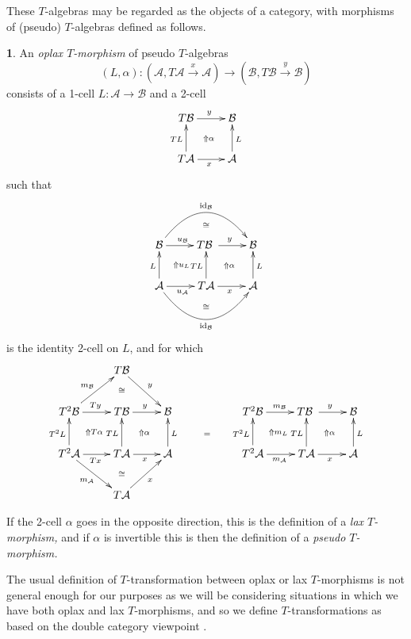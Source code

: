 \documentclass[a4paper,oneside,english]{amsart}
\numberwithin{equation}{section}
\numberwithin{figure}{section}
\theoremstyle{plain}
\theoremstyle{definition}
\newtheorem{defn}[thm]{\protect\definitionname}
\theoremstyle{remark}
\theoremstyle{definition}
\theoremstyle{plain}
\theoremstyle{plain}
\theoremstyle{plain}
\providecommand{\definitionname}{Definition}
\begin{document}
These $T$-algebras may be regarded as the objects of a category,
with morphisms of (pseudo) $T$-algebras defined as follows.
\begin{defn}
An \emph{oplax $T$-morphism} of pseudo $T$-algebras
\[
\left(L,\alpha\right)\colon\left(\mathcal{A},T\mathcal{A}\stackrel{x}{\rightarrow}\mathcal{A}\right)\to\left(\mathcal{B},T\mathcal{B}\stackrel{y}{\rightarrow}\mathcal{B}\right)
\]
consists of a 1-cell $L\colon\mathcal{A}\to\mathcal{B}$ and a 2-cell
\[
\xymatrix{T\mathcal{B}\ar[r]^{y}\ar@{}[rd]|-{\Uparrow\alpha} & \mathcal{B}\\
T\mathcal{A}\ar[r]_{x}\ar[u]^{TL} & \mathcal{A}\ar[u]_{L}
}
\]
such that 
\[
\xymatrix{ & \;\\
\mathcal{B}\ar[r]^{u_{\mathcal{B}}}\ar@{}[rd]|-{\Uparrow u_{L}}\ar@/^{2.5pc}/[rr]^{\textnormal{id}_{\mathcal{B}}} & T\mathcal{B}\ar[r]^{y}\;\ar@{}[rd]|-{\Uparrow\alpha}\ar@{}[u]|-{\cong} & \mathcal{B}\\
\mathcal{A}\ar[u]^{L}\ar[r]_{u_{\mathcal{A}}}\ar@/_{2.5pc}/[rr]_{\textnormal{id}_{\mathcal{B}}} & T\mathcal{A}\ar[r]_{x}\ar[u]^{TL}\ar@{}[d]|-{\cong} & \mathcal{A}\ar[u]_{L}\\
 & \;
}
\]
is the identity 2-cell on $L$, and for which
\[
\xymatrix{ & T\mathcal{B}\ar[rd]^{y}\\
T^{2}\mathcal{B}\ar[r]^{Ty}\ar@{}[rd]|-{\Uparrow T\alpha}\ar[ru]^{m_{\mathcal{B}}} & T\mathcal{B}\ar[r]^{y}\ar@{}[rd]|-{\Uparrow\alpha}\ar@{}[u]|-{\cong} & \mathcal{B} & \ar@{}[d]|-{=} & T^{2}\mathcal{B}\ar[r]^{m_{\mathcal{B}}}\ar@{}[dr]|-{\Uparrow m_{L}} & T\mathcal{B}\ar[r]^{y}\;\ar@{}[rd]|-{\Uparrow\alpha} & \mathcal{B}\\
T^{2}\mathcal{A}\ar[u]^{T^{2}L}\ar[r]_{Tx}\ar[rd]_{m_{\mathcal{A}}} & T\mathcal{A}\ar[r]_{x}\ar[u]^{TL} & \mathcal{A}\ar[u]_{L} & \; & T^{2}\mathcal{A}\ar[u]^{T^{2}L}\ar[r]_{m_{\mathcal{A}}} & T\mathcal{A}\ar[r]_{x}\ar[u]^{TL} & \mathcal{A}\ar[u]_{L}\\
 & T\mathcal{A}\ar[ur]_{x}\ar@{}[u]|-{\cong}
}
\]

If the 2-cell $\alpha$ goes in the opposite direction, this is the
definition of a \emph{lax $T$-morphism, }and if $\alpha$ is invertible
this is then the definition of a \emph{pseudo $T$-morphism.}
\end{defn}
The usual definition of $T$-transformation between oplax or lax $T$-morphisms
is not general enough for our purposes as we will be considering situations
in which we have both oplax and lax $T$-morphisms, and so we define
$T$-transformations as based on the double category viewpoint \cite{adjointdouble}.
\end{document}
